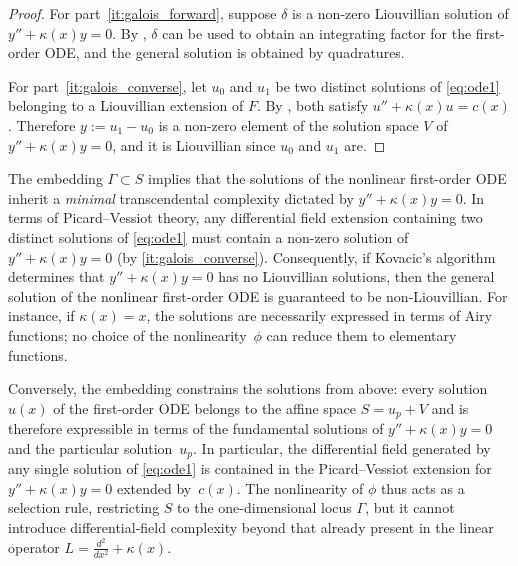 \documentclass[preprint,a4paper]{elsarticle}
\begin{document}
\begin{proof}
For part~\ref{it:galois_forward}, suppose $\delta$ is a non-zero Liouvillian solution of $y''+\kappa(x)y=0$. By , $\delta$ can be used to obtain an integrating factor for the first-order ODE, and the general solution is obtained by quadratures.

For part~\ref{it:galois_converse}, let $u_0$ and $u_1$ be two distinct solutions of \eqref{eq:ode1} belonging to a Liouvillian extension of $F$. By , both satisfy $u''+\kappa(x)u=c(x)$. Therefore $y:=u_1-u_0$ is a non-zero element of the solution space $V$ of $y''+\kappa(x)y=0$, and it is Liouvillian since $u_0$ and $u_1$ are.
\end{proof}


\begin{remark}\label{rem:complexity_floor}
The embedding $\Gamma\subset S$ implies that the solutions of the nonlinear first-order ODE inherit a \emph{minimal} transcendental complexity dictated by $y''+\kappa(x)y=0$. In terms of Picard--Vessiot theory, any differential field extension containing two distinct solutions of \eqref{eq:ode1} must contain a non-zero solution of $y''+\kappa(x)y=0$ (by \ref{it:galois_converse}). Consequently, if Kovacic's algorithm determines that $y''+\kappa(x)y=0$ has no Liouvillian solutions, then the general solution of the nonlinear first-order ODE is guaranteed to be non-Liouvillian. For instance, if $\kappa(x)=x$, the solutions are necessarily expressed in terms of Airy functions; no choice of the nonlinearity~$\phi$ can reduce them to elementary functions.
\end{remark}

\begin{remark}\label{rem:complexity_ceiling}
Conversely, the embedding constrains the solutions from above: every solution $u(x)$ of the first-order ODE belongs to the affine space $S=u_p+V$ and is therefore expressible in terms of the fundamental solutions of $y''+\kappa(x)y=0$ and the particular solution~$u_p$. In particular, the differential field generated by any single solution of \eqref{eq:ode1} is contained in the Picard--Vessiot extension for $y''+\kappa(x)y=0$ extended by~$c(x)$. The nonlinearity of $\phi$ thus acts as a selection rule, restricting $S$ to the one-dimensional locus $\Gamma$, but it cannot introduce differential-field complexity beyond that already present in the linear operator $L=\frac{d^2}{dx^2}+\kappa(x)$.
\end{remark}
\end{document}
